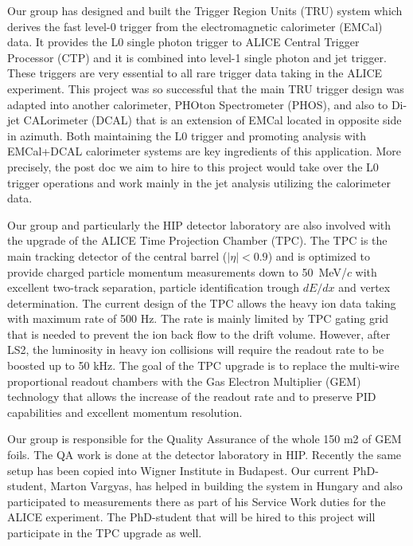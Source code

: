 Our group has designed and built the Trigger Region Units (TRU) system which derives the fast level-0 trigger from the electromagnetic calorimeter (EMCal) data. It provides the L0 single photon trigger to ALICE Central Trigger Processor (CTP) and it is combined into level-1 single photon and jet trigger. 
These triggers are very essential to all rare trigger data taking in the ALICE experiment. This project was so successful that the main TRU trigger design was adapted into another calorimeter, PHOton Spectrometer (PHOS), and also to Di-jet CALorimeter (DCAL) that is an extension of EMCal located in opposite side in azimuth. Both maintaining the L0 trigger and promoting analysis with EMCal+DCAL calorimeter systems are key ingredients of this application.
More precisely, the post doc we aim to hire to this project would take over the L0 trigger operations and work mainly in the jet analysis utilizing the calorimeter data.

Our group and particularly the HIP detector laboratory are also involved with the upgrade of the ALICE Time Projection Chamber (TPC). The TPC is the main tracking detector of the central barrel ($|\eta|<0.9$) and is optimized to provide charged particle momentum measurements down to 50~MeV/$c$ with excellent two-track separation, particle identification trough $dE/dx$ and vertex determination. The current design of the TPC allows the heavy ion data taking with maximum rate of 500 Hz. The rate is mainly limited by TPC gating grid that is needed to prevent the ion back flow to the drift volume. 
However, after LS2, the luminosity in heavy ion collisions will require the readout rate to be boosted up to 50 kHz. 
The goal of the TPC upgrade is to replace the multi-wire proportional readout chambers with the Gas Electron Multiplier (GEM) technology that allows the increase of the readout rate and to preserve PID capabilities and excellent momentum resolution.

Our group is responsible for the Quality Assurance of the whole 150 m2 of GEM foils. The QA work is done at the detector laboratory in HIP. Recently the same setup has been copied into Wigner Institute in Budapest. Our current PhD-student, Marton Vargyas, has helped in building the system in Hungary and also participated to measurements there as part of his Service Work duties for the ALICE experiment. 
The PhD-student that will be hired to this project will participate in the TPC upgrade as well.

